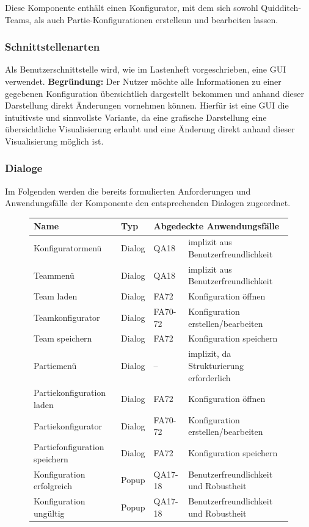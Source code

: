 Diese Komponente enthält einen Konfigurator, mit dem sich sowohl Quidditch-Teams, als auch Partie-Konfigurationen erstelleun und bearbeiten lassen.

\subsubsection{Schnittstellenarten}
Als Benutzerschnittstelle wird, wie im Lastenheft vorgeschrieben, eine GUI verwendet. \textbf{Begründung:} Der Nutzer möchte alle Informationen zu einer gegebenen Konfiguration übersichtlich dargestellt bekommen und anhand dieser Darstellung direkt Änderungen vornehmen können. Hierfür ist eine GUI die intuitivste und sinnvollste Variante, da eine grafische Darstellung eine übersichtliche Visualisierung erlaubt und eine Änderung direkt anhand dieser Visualisierung möglich ist. 

\subsubsection{Dialoge}
Im Folgenden werden die bereits formulierten Anforderungen und Anwendungsfälle der Komponente den entsprechenden Dialogen zugeordnet.

\begin{figure}[H]
    \centering
    \begin{tabular}{| l l l l |}
    \hline
    \textbf{Name} & \textbf{Typ} & \multicolumn{2}{l|}{\textbf{Abgedeckte Anwendungsfälle}} \\\hline
    Konfiguratormenü & Dialog & QA18 & implizit aus Benutzerfreundlichkeit\\\hline
    Teammenü & Dialog & QA18 & implizit aus Benutzerfreundlichkeit\\\hline
    Team laden & Dialog & FA72 & Konfiguration öffnen \\\hline
    Teamkonfigurator & Dialog & FA70-72 & Konfiguration erstellen/bearbeiten\\\hline
    Team speichern & Dialog & FA72 & Konfiguration speichern \\\hline
    Partiemenü & Dialog & – & implizit, da Strukturierung erforderlich\\\hline
    Partiekonfiguration laden & Dialog & FA72 & Konfiguration öffnen \\\hline
    Partiekonfigurator & Dialog & FA70-72 & Konfiguration erstellen/bearbeiten\\\hline
    Partiefonfiguration speichern & Dialog & FA72 & Konfiguration speichern \\\hline
    Konfiguration erfolgreich & Popup & QA17-18 & Benutzerfreundlichkeit und Robustheit\\\hline
    Konfiguration ungültig & Popup & QA17-18 & Benutzerfreundlichkeit und Robustheit\\\hline
    \end{tabular}
\end{figure}

